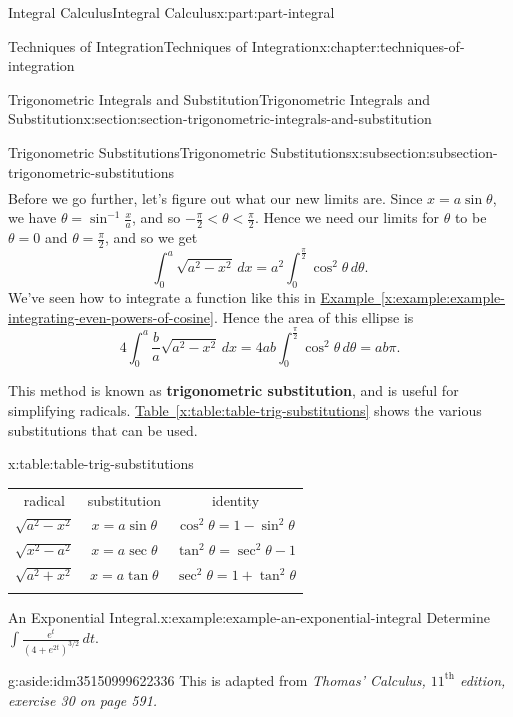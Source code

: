 \documentclass[twoside,10pt,]{book}
\newcommand{\tabularfont}{\relax}
\newcommand{\xreffont}{\relax}
\newcommand{\terminology}[1]{\textbf{#1}}
\numberwithin{equation}{part}
\newcommand{\hrulethin}  {\noalign{\hrule height 0.04em}}
\newcommand{\hrulethick} {\noalign{\hrule height 0.11em}}
\newcommand{\lt}{<}
\begin{document}
\begin{partptx}{Integral Calculus}{}{Integral Calculus}{}{}{x:part:part-integral}
\begin{chapterptx}{Techniques of Integration}{}{Techniques of Integration}{}{}{x:chapter:techniques-of-integration}
\begin{sectionptx}{Trigonometric Integrals and Substitution}{}{Trigonometric Integrals and Substitution}{}{}{x:section:section-trigonometric-integrals-and-substitution}
\begin{subsectionptx}{Trigonometric Substitutions}{}{Trigonometric Substitutions}{}{}{x:subsection:subsection-trigonometric-substitutions}
\begin{align*}
\end{align*}
Before we go further, let's figure out what our new limits are. Since \(x = a\sin\theta\), we have \(\theta = \sin^{-1}\frac{x}{a}\), and so \(-\frac{\pi}{2} \lt \theta \lt \frac{\pi}{2}\). Hence we need our limits for \(\theta\) to be \(\theta = 0\) and \(\theta = \frac{\pi}{2}\), and so we get%
\begin{equation*}
\int_{0}^{a}\sqrt{a^{2} - x^{2}}\,dx = a^{2}\int_{0}^{\frac{\pi}{2}}\cos^{2}\theta\,d\theta.
\end{equation*}
We've seen how to integrate a function like this in \hyperref[x:example:example-integrating-even-powers-of-cosine]{Example~{\xreffont\ref{x:example:example-integrating-even-powers-of-cosine}}}. Hence the area of this ellipse is%
\begin{equation*}
4\int_{0}^{a}\frac{b}{a}\sqrt{a^{2} - x^{2}}\,dx = 4ab\int_{0}^{\frac{\pi}{2}}\cos^{2}\theta\,d\theta = ab\pi.
\end{equation*}
%
\par
This method is known as \terminology{trigonometric substitution}, and is useful for simplifying radicals. \hyperref[x:table:table-trig-substitutions]{Table~{\xreffont\ref{x:table:table-trig-substitutions}}} shows the various substitutions that can be used.%
\begin{tableptx}{\textbf{}}{x:table:table-trig-substitutions}{}%
\centering%
{\tabularfont%
\begin{tabular}{ccc}\hrulethick
radical&substitution&identity\tabularnewline\hrulethin
\(\sqrt{a^{2} - x^{2}}\)&\(x = a\sin\theta\)&\(\cos^{2}\theta = 1-\sin^{2}\theta\)\tabularnewline[0pt]
\(\sqrt{x^{2} - a^{2}}\)&\(x = a\sec\theta\)&\(\tan^{2}\theta = \sec^{2}\theta - 1\)\tabularnewline[0pt]
\(\sqrt{a^{2} + x^{2}}\)&\(x = a\tan\theta\)&\(\sec^{2}\theta = 1+\tan^{2}\theta\)\tabularnewline\hrulethick
\end{tabular}
}%
\end{tableptx}%
\begin{example}{An Exponential Integral.}{x:example:example-an-exponential-integral}%
Determine \(\displaystyle\int\frac{e^{t}}{(4 + e^{2t})^{3/2}}\,dt.\)%
\begin{aside}{}{g:aside:idm35150999622336}%
This is adapted from \emph{Thomas' Calculus, \(11^{\text{th}}\) edition, exercise 30 on page 591.}%
\end{aside}
\par\smallskip%

\end{example}
\end{subsectionptx}
\end{sectionptx}
\end{chapterptx}
\end{partptx}
\end{document}
